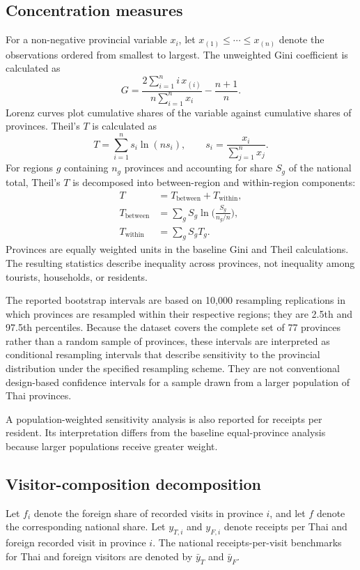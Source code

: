 \documentclass[11pt,a4paper]{article}
\begin{document}
\subsection{Concentration measures}
For a non-negative provincial variable $x_i$, let $x_{(1)}\le\cdots\le x_{(n)}$ denote the observations ordered from smallest to largest. The unweighted Gini coefficient is calculated as
\begin{equation}
G=\frac{2\sum_{i=1}^n i\,x_{(i)}}{n\sum_{i=1}^n x_i}-\frac{n+1}{n}.
\end{equation}
Lorenz curves plot cumulative shares of the variable against cumulative shares of provinces. Theil's $T$ is calculated as
\begin{equation}
T=\sum_{i=1}^n s_i\ln(ns_i),\qquad s_i=\frac{x_i}{\sum_{j=1}^n x_j}.
\end{equation}
For regions $g$ containing $n_g$ provinces and accounting for share $S_g$ of the national total, Theil's $T$ is decomposed into between-region and within-region components:
\begin{align}
T&=T_{\text{between}}+T_{\text{within}},\\
T_{\text{between}}&=\sum_g S_g\ln\!\Big(\frac{S_g}{n_g/n}\Big),\\
T_{\text{within}}&=\sum_g S_g T_g.
\end{align}
Provinces are equally weighted units in the baseline Gini and Theil calculations. The resulting statistics describe inequality across provinces, not inequality among tourists, households, or residents.

The reported bootstrap intervals are based on 10,000 resampling replications in which provinces are resampled within their respective regions; they are 2.5th and 97.5th percentiles. Because the dataset covers the complete set of 77 provinces rather than a random sample of provinces, these intervals are interpreted as conditional resampling intervals that describe sensitivity to the provincial distribution under the specified resampling scheme. They are not conventional design-based confidence intervals for a sample drawn from a larger population of Thai provinces.

A population-weighted sensitivity analysis is also reported for receipts per resident. Its interpretation differs from the baseline equal-province analysis because larger populations receive greater weight.

\subsection{Visitor-composition decomposition}
Let $f_i$ denote the foreign share of recorded visits in province $i$, and let $f$ denote the corresponding national share. Let $y_{T,i}$ and $y_{F,i}$ denote receipts per Thai and foreign recorded visit in province $i$. The national receipts-per-visit benchmarks for Thai and foreign visitors are denoted by $\bar y_T$ and $\bar y_F$.
\end{document}
